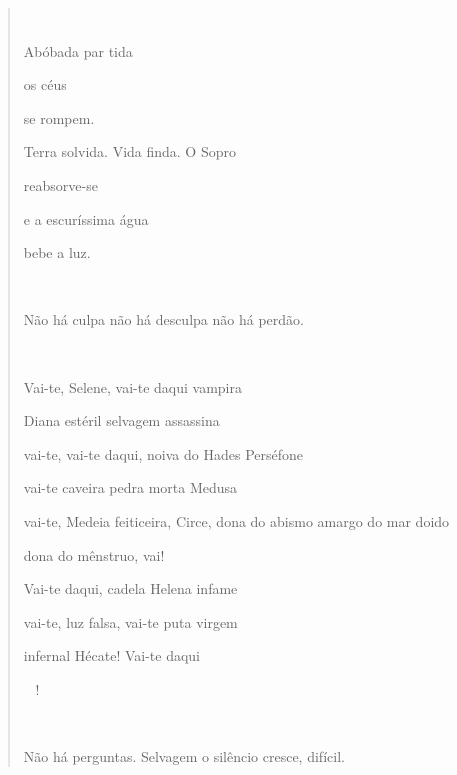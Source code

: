 \begin{quote}


Abóbada par tida

os céus

se rompem.

Terra solvida. Vida finda. O Sopro

reabsorve-se

e a escuríssima água

bebe a luz.



Não há culpa não há desculpa não há perdão.



Vai-te, Selene, vai-te daqui vampira

Diana estéril selvagem assassina

vai-te, vai-te daqui, noiva do Hades Perséfone

vai-te caveira pedra morta Medusa

vai-te, Medeia feiticeira, Circe, dona do abismo amargo do mar doido

dona do mênstruo, vai!

Vai-te daqui, cadela Helena infame

vai-te, luz falsa, vai-te puta virgem

infernal Hécate! Vai-te daqui

!



Não há perguntas. Selvagem o silêncio cresce, difícil.
\end{quote}

\subsection{}\label{section-8}

